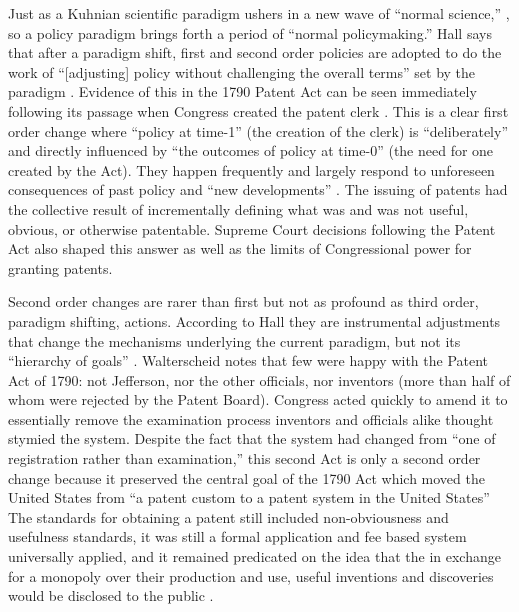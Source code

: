 \documentclass[12pt,letterpaper]{article}
\begin{document}
{Just as a Kuhnian scientific paradigm ushers in a new wave of ``normal science,'' \autocite{Kuhn1970}, so a policy paradigm brings forth a period of ``normal policymaking.'' Hall says that after a paradigm shift, first and second order policies are adopted to do the work of ``[adjusting] policy without challenging the overall terms'' set by the paradigm \autocite[279]{Hall1993}. Evidence of this in the 1790 Patent Act can be seen immediately following its passage when Congress created the patent clerk \autocite{Federico1936}. This is a clear first order change where ``policy at time-1'' (the creation of the clerk) is ``deliberately'' and directly influenced by ``the outcomes of policy at time-0'' (the need for one created by the Act). They happen frequently and largely respond to unforeseen consequences of past policy and ``new developments'' \autocite[281]{Hall1993}. The issuing of patents had the collective result of incrementally defining what was and was not useful, obvious, or otherwise patentable. Supreme Court decisions following the Patent Act also shaped this answer as well as the limits of Congressional power for granting patents.

Second order changes are rarer than first but not as profound as third order, paradigm shifting, actions. According to Hall they are instrumental adjustments that change the mechanisms underlying the current paradigm, but not its ``hierarchy of goals'' \autocite{Hall1993}. Walterscheid notes that few were happy with the Patent Act of 1790: not Jefferson, nor the other officials, nor inventors (more than half of whom were rejected by the Patent Board). Congress acted quickly to amend it to essentially remove the examination process inventors and officials alike thought stymied the system. Despite the fact that the system had changed from ``one of registration rather than examination,'' \autocite{Walterscheid1999} this second Act is only a second order change because it preserved the central goal of the 1790 Act which moved the United States from ``a patent custom to a patent system in the United States'' \autocite{Walterscheid1997} The standards for obtaining a patent still included non-obviousness and usefulness standards, it was still a formal application and fee based system universally applied, and it remained predicated on the idea that the in exchange for a monopoly over their production and use, useful inventions and discoveries would be disclosed to the public \autocite{Walterscheid1997}. 

}
\end{document}
